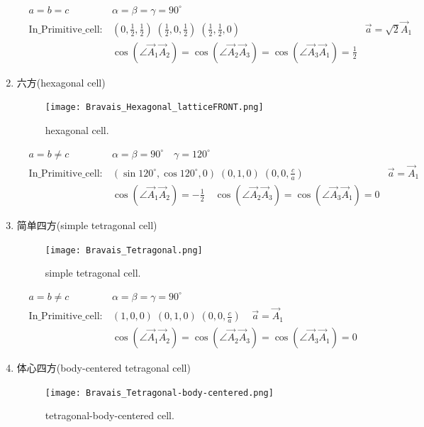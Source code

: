\documentclass{article}      %
\begin{document}
\begin{enumerate}
\begin{displaymath}
\begin{aligned}
	& a=b=c\qquad &\alpha=\beta=\gamma=90^{\circ}\\
		&\mathrm{In\_Primitive\_cell}:&(0,\frac12,\frac12)\;(\frac12,0,\frac12)\;(\frac12,\frac12,0)\;\;\;\;&\vec a=\sqrt 2\vec A_1\\
		& &\cos(\angle\vec A_1\vec A_2)=\cos(\angle\vec A_2\vec A_3)=\cos(\angle\vec A_3\vec A_1)=\frac12
	\end{aligned}
\end{displaymath}
		\item 六方(\textrm{hexagonal cell})
\begin{figure}[h!]
\centering
\texttt{[image: Bravais\_Hexagonal\_latticeFRONT.png]}
\caption{\small hexagonal cell.}%
\label{Bravais:hexagonal cell}
\end{figure}
\begin{displaymath}
	\begin{aligned}
		& a=b\neq c & \alpha=\beta=90^{\circ} \quad \gamma=120^{\circ}\\
		&\mathrm{In\_Primitive\_cell}:&(\sin120^{\circ},\cos120^{\circ},0)\;(0,1,0)\;(0,0,\frac{c}{a})\;\;\;\;&\vec a=\vec A_1\\
		& &\cos(\angle\vec A_1\vec A_2)=-\frac12\quad\cos(\angle\vec A_2\vec A_3)=\cos(\angle\vec A_3\vec A_1)=0
	\end{aligned}
\end{displaymath}
		\item 简单四方(\textrm{simple tetragonal cell})
\begin{figure}[h!]
\centering
\texttt{[image: Bravais\_Tetragonal.png]}
\caption{\small simple tetragonal cell.}%
\label{Bravais:tetragonal cell}
\end{figure}
\begin{displaymath}
	\begin{aligned}
	&a=b\neq c &\alpha=\beta=\gamma=90^{\circ} \\
	&\mathrm{In\_Primitive\_cell}:&(1,0,0)\;(0,1,0)\;(0,0,\frac{c}{a})\;\;\;\;\vec a=\vec A_1\\
		& &\cos(\angle\vec A_1\vec A_2)=\cos(\angle\vec A_2\vec A_3)=\cos(\angle\vec A_3\vec A_1)=0
	\end{aligned}
\end{displaymath}
		\item 体心四方(\textrm{body-centered tetragonal cell})
\begin{figure}[h!]
\centering
\texttt{[image: Bravais\_Tetragonal-body-centered.png]}
\caption{\small tetragonal-body-centered cell.}%

\end{figure}
\end{enumerate}
\end{document}
